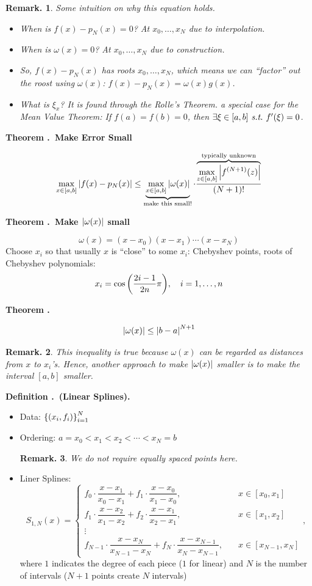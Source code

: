\documentclass[12pt, a4paper]{article}
\newcounter{index}[subsection]
\newenvironment*{df}[1]{\par\noindent\textbf{Definition \thesubsection.\stepcounter{index}\theindex\ (#1).}}{\par}
\newenvironment*{thm}[1]{\begin{tcolorbox}\par\noindent\textbf{Theorem \thesubsection.\stepcounter{index}\theindex\ #1} \par}{\par\end{tcolorbox}}
\newtheorem{rmk}{Remark.}[section]
\def\st{\emph{\ s.t.\ }}
\begin{document}
\begin{rmk}
	Some intuition on why this equation holds. 
	\begin{itemize}
		\item When is $f(x)-p_N(x)=0$? At $x_0,\dots,x_N$ due to interpolation.
		\item When is $\omega(x)=0$? At $x_0,\dots,x_N$ due to construction.
		\item So, $f(x)-p_N(x)$ has roots $x_0,\dots,x_N$, which means we can ``factor'' out the roost using $\omega(x)$: $f(x)-p_N(x)=\omega(x)g(x)$.
		\item What is $\xi_x$? It is found through the Rolle's Theorem. a special case for the Mean Value Theorem: If $f(a)=f(b)=0$, then $\exists\xi\in[a,b]\st f'(\xi)=0$.
	\end{itemize}
\end{rmk}
\begin{thm}{Make Error Small}
	\[\max_{x\in[a,b]}\qty|f(x)-p_N(x)|\leq\underbrace{\max_{x\in[a,b]}\qty|\omega(x)|}_\text{make this small!}\cdot\dfrac{\overbrace{\max_{z\in[a,b]}\qty|f^{(N+1)}(z)|}^\text{typically unknown}}{(N+1)!}\]	
\end{thm}
\begin{thm}{Make $\qty|\omega(x)|$ small}
	\[\omega(x)=(x-x_0)(x-x_1)\cdots(x-x_N)\] Choose $x_i$ so that usually $x$ is ``close'' to some $x_i$: Chebyshev points, roots of Chebyshev polynomials: \[x_i=\cos\qty(\dfrac{2i-1}{2n}\pi),\quad i=1,\dots,n\]
\end{thm}
\begin{thm}{}
	\[\qty|\omega(x)|\leq\qty|b-a|^{N+1}\]
	\begin{rmk}This inequality is true because $\omega(x)$ can be regarded as distances from $x$ to $x_i$'s. Hence, another approach to make $\qty|\omega(x)|$ smaller is to make the interval $[a,b]$ smaller. \end{rmk}
\end{thm}
\begin{df}{Linear Splines}
	\begin{itemize}
		\item Data: $\qty{(x_i,f_i)}_{i=1}^N$
		\item Ordering: $a=x_0<x_1<x_2<\cdots<x_N=b$
		\begin{rmk} We do not require equally spaced points here. \end{rmk}
		\item Liner Splines: \[S_{1,N}(x)=\begin{cases}f_0\cdot\dfrac{x-x_1}{x_0-x_1}+f_1\cdot\dfrac{x-x_0}{x_1-x_0},&\quad x\in[x_0,x_1]\\f_1\cdot\dfrac{x-x_2}{x_1-x_2}+f_2\cdot\dfrac{x-x_1}{x_2-x_1},&\quad x\in[x_1,x_2]\\\vdots\\f_{N-1}\cdot\dfrac{x-x_N}{x_{N-1}-x_N}+f_N\cdot\dfrac{x-x_{N-1}}{x_N-x_{N-1}},&\quad x\in[x_{N-1},x_N]\end{cases},\] where $1$ indicates the degree of each piece ($1$ for linear) and $N$ is the number of intervals ($N+1$ points create $N$ intervals)
	\end{itemize}	
\end{df}
\end{document}
